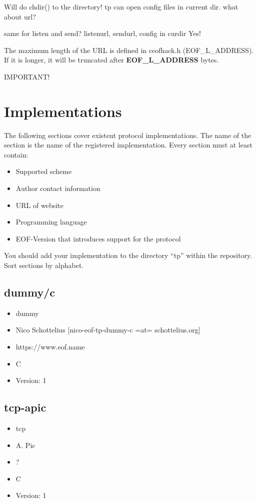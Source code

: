 \documentclass[12pt,a4paper]{book}
\begin{document}
Will do chdir() to the directory! tp can open config files in current dir.
what about url?

same for listen and send?
   listenurl, sendurl, config in curdir
Yes!

The maximum length of the URL is defined in ceofhack.h (EOF\_L\_ADDRESS).
If it is longer, it will be truncated after \textbf{EOF\_L\_ADDRESS} bytes.

IMPORTANT!
\section{Implementations}
The following sections cover existent protocol implementations.
The name of the section is the name of the registered implementation.
Every section must at least contain:
\begin{itemize}
\item Supported scheme
\item Author contact information
\item URL of website
\item Programming language
\item EOF-Version that introduces support for the protocol
\end{itemize}
You should add your implementation to the directory "`tp"' within the
repository.
Sort sections by alphabet.

\subsection{dummy/c}
\begin{itemize}
\item dummy
\item Nico Schottelius [nico-eof-tp-dummy-c =at= schottelius.org]
\item https://www.eof.name
\item C
\item Version: 1
\end{itemize}
\subsection{tcp-apic}
\begin{itemize}
\item tcp
\item A. Pic
\item ?
\item C
\item Version: 1
\end{itemize}
\end{document}
